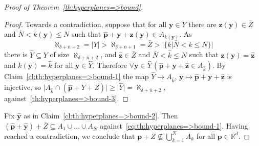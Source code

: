 \documentclass[10pt,a4paper]{amsart}
\newcommand{\FORALL}[1]{\forall {#1} \, }
\newcommand{\Mid}{\boldsymbol\mid}			%
\newcommand{\R}{\mathbb{R}}	%
\newcommand{\card}[1]{\mathopen | #1 \mathclose |}		%
\newcommand{\setof}[2]{\mathopen \{{#1}\Mid{#2} \mathclose\}} %
\begin{document}
\begin{proof}[Proof of Theorem~\ref{th:hyperplanes=>bound}]
\begin{proof}
Towards a contradiction, suppose that for all \( \mathbf{y} \in Y \) there are \( \mathbf{z} ( \mathbf{y} ) \in \bar{Z} \) and \( \bar{N} < k ( \mathbf{y} ) \leq N \) such that \( \hat{\mathbf{p}} + \mathbf{y} + \mathbf{z} ( \mathbf{y} ) \in A_{ k ( \mathbf{y} ) } \).
As 
\[
 \aleph_{ \delta + \bar{n} + 2 } = \card{Y} > \aleph_{ \delta + \bar{n} + 1 } =\bar{Z} > \card{\setof{ k }{ \bar{N} < k \leq N}} 
\] 
there is \( \hat{Y} \subseteq Y \) of size \( \aleph_{ \delta + \bar{n} + 2 } \), and \( \hat{\mathbf{z}} \in \bar{Z} \) and \( \bar{N} < \hat{k} \leq N \) such that \( \mathbf{z} ( \mathbf{y} ) = \hat{\mathbf{z}} \) and \( k ( \mathbf{y} ) = \hat{k} \) for all \( \mathbf{y} \in \hat{Y} \).
Therefore \( \FORALL{ \mathbf{y} \in \hat{Y} } ( \hat{\mathbf{p}} + \mathbf{y} + \hat{\mathbf{z}} \in A_{\hat{k}} ) \).
By Claim~\ref{cl:th:hyperplanes=>bound-1} the map \( \hat{Y} \to A_{\hat{k}} \), \( \mathbf{y} \mapsto \hat{\mathbf{p}} + \mathbf{y} + \hat{\mathbf{z}} \) is injective, so \( \card{ A_{\hat{k}} \cap ( \hat{\mathbf{p}} + Y + \bar{Z} ) } \geq \card{ \hat{Y} } = \aleph _{ \delta + \bar{n} + 2 } \), against~\eqref{th:hyperplanes=>bound-3}.
\end{proof}

Fix \( \hat{\mathbf{y}} \) as in Claim~\ref{cl:th:hyperplanes=>bound-2}.
Then \( ( \hat{\mathbf{p}} + \hat{ \mathbf{y} } ) + \bar{Z} \subseteq A_1 \cup \dots \cup A_{\bar{N}} \) against~\eqref{eq:th:hyperplanes=>bound-1}.
Having reached a contradiction, we conclude that \( \mathbf{p} + Z \nsubseteq \bigcup_{ k = 1 }^ N A_k \) for all \( \mathbf{p} \in \R^d \).
\end{proof}
\end{document}
